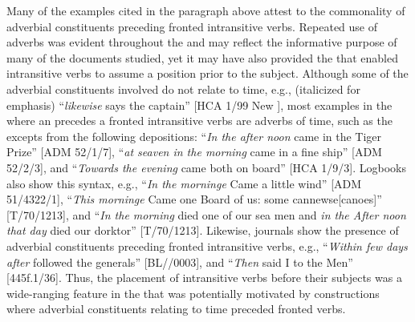 Many of the examples cited in the paragraph above attest to the commonality of adverbial constituents preceding fronted intransitive verbs. Repeated use of adverbs was evident throughout the  and may reflect the informative purpose of many of the documents studied, yet it may have also provided the  that enabled intransitive verbs to assume a position prior to the  subject. Although some of the adverbial constituents involved do not relate to time, e.g., (italicized for emphasis) “\textit{likewise} says the captain” [HCA 1/99 New \citealt{Providence1722}], most examples in the  where an  precedes a fronted intransitive verbs are adverbs of time, such as the excepts from the following depositions: “\textit{In the after noon} came in the Tiger Prize” [ADM 52/1/7], “\textit{at seaven in the morning} came in a fine ship” [ADM 52/2/3], and “\textit{Towards the evening} came both on board” [HCA 1/9/3]. Logbooks also show this syntax, e.g., “\textit{In the morninge} Came a little wind” [ADM 51/4322/1], “\textit{This morninge} Came one Board of us: some cannewse[canoes]” [T/70/1213], and “\textit{In the morning} died one of our sea men and \textit{in the After noon that day} died our dorktor” [T/70/1213]. Likewise, journals show the presence of adverbial constituents preceding fronted intransitive verbs, e.g., “\textit{Within few days after} followed the generals” [BL/\citealt{Egerton2395}/0003], and “\textit{Then} said I to the Men” [445f.1/36]. Thus, the placement of intransitive verbs before their  subjects was a wide-ranging feature in the  that was potentially motivated by constructions where adverbial constituents relating to time preceded fronted verbs.  

